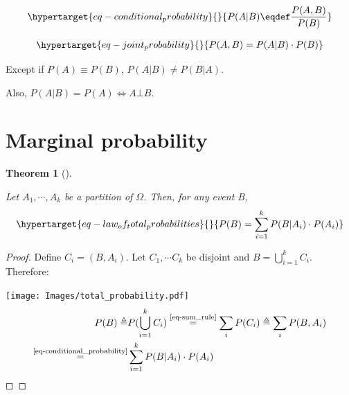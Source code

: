 \documentclass[
  letterpaper,
  12pt,
  british]{tufte-book}
\theoremstyle{plain}
\newtheorem{theorem}{Theorem}[chapter]
\theoremstyle{plain}
\theoremstyle{definition}
\theoremstyle{remark}
\begin{document}
\begin{equation}\protect\hypertarget{eq-conditional_probability}{}{\begin{aligned}
P(A|B) \eqdef \frac{P(A,B)}{P(B)}
\end{aligned}}\label{eq-conditional_probability}\end{equation}

\begin{equation}\protect\hypertarget{eq-joint_probability}{}{\begin{aligned}
P(A, B) = P(A|B)\cdot P(B)
\end{aligned}}\label{eq-joint_probability}\end{equation}

Except if \(P(A) \equiv P(B)\), \(P(A|B) \neq P(B|A)\).

Also, \(P(A|B)=P(A) \iff A \bot B\).

\hypertarget{sec-marginalisation}{%
\section{Marginal probability}\label{sec-marginalisation}}

\leavevmode{}%
\begin{theorem}[]\label{thm-marginal_probability}

Let \(A_1, \cdots, A_k\) be a partition of \(\Omega\). Then, for any
\emph{event} B,
\begin{equation}\protect\hypertarget{eq-law_of_total_probabilities}{}{\begin{aligned}
P(B)=\sum_{i=1}^k P(B|A_i)\cdot P(A_i)
\end{aligned}}\label{eq-law_of_total_probabilities}\end{equation}

\end{theorem}

\begin{proof}

Define \(C_i = (B,A_i)\). Let \(C_1, \cdots C_k\) be disjoint and
\(B = \bigcup\limits_{i=1}^k C_i\).\\
Therefore:

\texttt{[image: Images/total\_probability.pdf]} \begin{align}
        P(B) \triangleq &P(\bigcup\limits_{i=1}^k C_i)
        \overset{\text{\ref{eq-sum_rule}}}{=} \sum_i P(C_i) \triangleq \sum_i P(B,A_i) \\
        \overset{\text{\ref{eq-conditional_probability}}}{=} &\sum_{i=1}^k P(B|A_i)\cdot P(A_i) 
\end{align} ◻

\end{proof}
\end{document}
